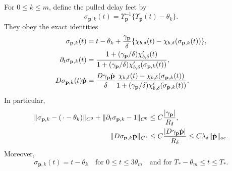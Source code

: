 \begin{lemma}
For \(0\le k\le m\), define the pulled delay feet by
\begin{equation}
 \sigma_{\mathbf p,k}(t)
 =\Upsilon_{\mathbf p}^{-1}
     \{\Upsilon_{\mathbf p}(t)-\theta_k\}.      \label{eq:oe-entry-relative-feet}
\end{equation}
They obey the exact identities
\begin{align}
 \sigma_{\mathbf p,k}(t)
 &=t-\theta_k+\frac{\gamma_{\mathbf p}}{\delta}
   \{\chi_{b,\delta}(t)
       -\chi_{b,\delta}(\sigma_{\mathbf p,k}(t))\},
                                                        \notag\\
 \partial_t\sigma_{\mathbf p,k}(t)
 &=\frac{1+(\gamma_{\mathbf p}/\delta)
                 \chi_{b,\delta}'(t)}
         {1+(\gamma_{\mathbf p}/\delta)
                 \chi_{b,\delta}'(\sigma_{\mathbf p,k}(t))},
                                                        \notag\\
 D\sigma_{\mathbf p,k}(t)\dot{\mathbf p}
 &=\frac{D\gamma_{\mathbf p}\dot{\mathbf p}}{\delta}
   \frac{\chi_{b,\delta}(t)
       -\chi_{b,\delta}(\sigma_{\mathbf p,k}(t))}
        {1+(\gamma_{\mathbf p}/\delta)
                 \chi_{b,\delta}'(\sigma_{\mathbf p,k}(t))}.
                                                        \label{eq:oe-entry-relative-foot-identities}
\end{align}
In particular,
\begin{align}
 \|\sigma_{\mathbf p,k}-(\,\cdot-\theta_k)\|_{C^0}
 +\|\partial_t\sigma_{\mathbf p,k}-1\|_{C^0}
 &\le C\frac{|\gamma_{\mathbf p}|}{R_\delta},
                                                        \label{eq:oe-entry-relative-foot-displacement}\\
 \|D\sigma_{\mathbf p,k}\dot{\mathbf p}\|_{C^1}
 &\le C\frac{|D\gamma_{\mathbf p}\dot{\mathbf p}|}{R_\delta}
 \le C\lambda_\delta\|\dot{\mathbf p}\|_{\rm oe}.
                                                        \label{eq:oe-entry-relative-foot-jet}
\end{align}
Moreover,
\begin{equation}
 \sigma_{\mathbf p,k}(t)=t-\theta_k
 \quad\text{for }0\le t\le3\theta_m
 \quad\text{and for }T_*-\theta_m\le t\le T_*.
                                                        \label{eq:oe-entry-relative-fixed-feet}
\end{equation}


\end{lemma}
